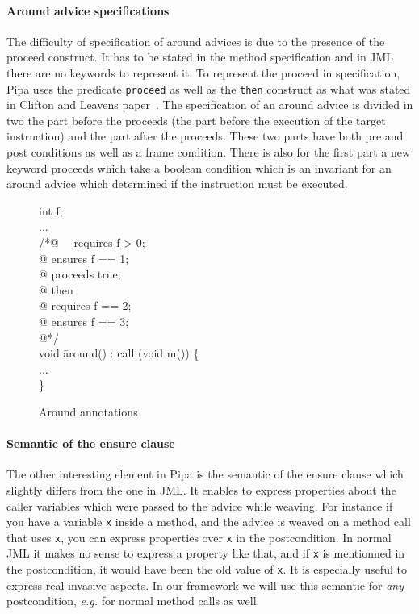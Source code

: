 \paragraph{Around advice specifications} The difficulty of specification of around advices is due to the presence
of the proceed construct. It has to be stated in the method specification and in JML there are no keywords to
represent it. To represent the proceed in specification, Pipa uses the predicate {\tt proceed}
as well as the {\tt then} construct as what was stated in Clifton and Leavens paper~\cite{clifton02spectators}.
The specification of an around advice is divided in two the part before the proceeds (the part before the 
execution of the target instruction) and the part after the proceeds. These two parts have both pre and post 
conditions as well as a frame condition. There is also for the first part a new keyword proceeds which take a 
boolean condition which is an invariant for an around advice which determined if the instruction must be executed.

\begin{figure}
\begin{center}\begin{minipage}{3cm}\bcode
int f;\\
...\\
/*\=@ \ \ \=requires f > 0;\+ \\
@ \>ensures f == 1;\\
@ \>proceeds true;\\
@ then\\
@ \> requires f == 2;\\
@ \> ensures f == 3;\\
@*/\-\\
void \= around() : call (void m()) \{\\
\>...\\
\} \ecode\end{minipage}\end{center}
\caption{Around annotations}
\label{arround_annot}
\end{figure}
\paragraph{Semantic of the ensure clause}
The other interesting element in Pipa is the semantic of the ensure clause which slightly differs from the one in
JML. It enables to express properties about the caller variables which were passed to the advice while 
weaving. For instance if you have a variable {\tt x} inside a method, 
and the advice is weaved on a method call that uses {\tt x}, you can express properties over {\tt x} in the 
postcondition. In normal JML it makes no sense to express a property like that, and if {\tt x} is mentionned
in the postcondition, it would have been the old value of {\tt x}. It is especially useful to express real 
invasive aspects. In our framework we will use this semantic for {\it any} postcondition, {\it e.g.} 
for normal method calls as well.